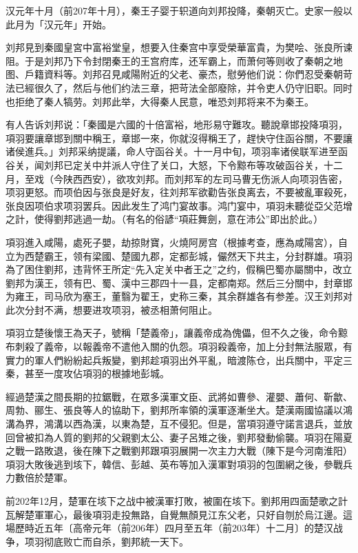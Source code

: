 汉元年十月（前207年十月），秦王子婴于轵道向刘邦投降，秦朝灭亡。史家一般以此月为「汉元年」开始。

刘邦見到秦國皇宮中富裕堂皇，想要入住秦宫中享受榮華富貴，为樊哙、张良所谏阻。于是刘邦乃下令封閉秦王的王宫府库，还军霸上，而萧何等则收了秦朝之地图、戶籍資料等。刘邦召見咸陽附近的父老、豪杰，慰勞他们说：你們忍受秦朝苛法已經很久了，然后与他们约法三章，把苛法全部廢除，并令吏人仍守旧职。同时也拒绝了秦人犒劳。刘邦此举，大得秦人民意，唯恐刘邦将来不为秦王。

有人告诉刘邦说：「秦國是六國的十倍富裕，地形易守難攻。聽說章邯投降項羽，項羽要讓章邯到關中稱王，章邯一來，你就沒得稱王了，趕快守住函谷關，不要讓诸侯進兵。」刘邦采纳提議，命人守函谷关。十一月中旬，项羽率诸侯联军进至函谷关，闻刘邦已定关中并派人守住了关口，大怒，下令黥布等攻破函谷关，十二月，至戏（今陕西西安），欲攻刘邦。而刘邦军的左司马曹无伤派人向项羽告密，项羽更怒。而项伯因与张良是好友，往刘邦军欲勸告张良离去，不要被亂軍殺死，张良因项伯求项羽罢兵。因此发生了鸿门宴故事。鸿门宴中，項羽未聽從亞父范增之計，使得劉邦逃過一劫。（有名的俗諺“項莊舞劍，意在沛公”即出於此。）

項羽進入咸陽，處死子嬰，劫掠財寶，火燒阿房宫（根據考查，應為咸陽宮），自立为西楚霸王，领有梁國、楚國九郡，定都彭城，儼然天下共主，分封群雄。項羽為了困住劉邦，违背怀王所定“先入定关中者王之”之约，假稱巴蜀亦屬關中，改立劉邦为漢王，领有巴、蜀、漢中三郡四十一县，定都南郑。然后三分關中，封章邯为雍王，司马欣为塞王，董翳为翟王，史称三秦，其余群雄各有参差。汉王刘邦对此次分封不满，想要进攻项羽，被丞相萧何阻止。

項羽立楚後懷王為天子，號稱「楚義帝」，讓義帝成為傀儡，但不久之後，命令黥布刺殺了義帝，以報義帝不遣他入關的仇怨。項羽殺義帝，加上分封無法服眾，有實力的軍人們紛紛起兵叛變，劉邦趁項羽出外平亂，暗渡陈仓，出兵關中，平定三秦，甚至一度攻佔項羽的根據地彭城。

經過楚漢之間長期的拉鋸戰，在眾多漢軍文臣、武將如曹參、灌嬰、蕭何、靳歙、周勃、郦生、張良等人的協助下，劉邦所率領的漢軍逐漸坐大。楚漢兩國協議以鴻溝為界，鴻溝以西為漢，以東為楚，互不侵犯。但是，當項羽遵守諾言退兵，並放回曾被扣為人質的劉邦的父親劉太公、妻子呂雉之後，劉邦發動偷襲。項羽在陽夏之戰一路敗退，後在陳下之戰劉邦跟項羽展開一次主力大戰（陳下是今河南淮阳）項羽大敗後逃到垓下，韓信、彭越、英布等加入漢軍對項羽的包圍網之後，參戰兵力數倍於楚軍。

前202年12月，楚軍在垓下之战中被漢軍打敗，被圍在垓下。劉邦用四面楚歌之計瓦解楚軍軍心，最後項羽走投無路，自覺無顏見江东父老，只好自刎於烏江邊。這場歷時近五年〔高帝元年（前206年）四月至五年（前203年）十二月〕的楚汉战争，项羽彻底败亡而自杀，劉邦統一天下。

